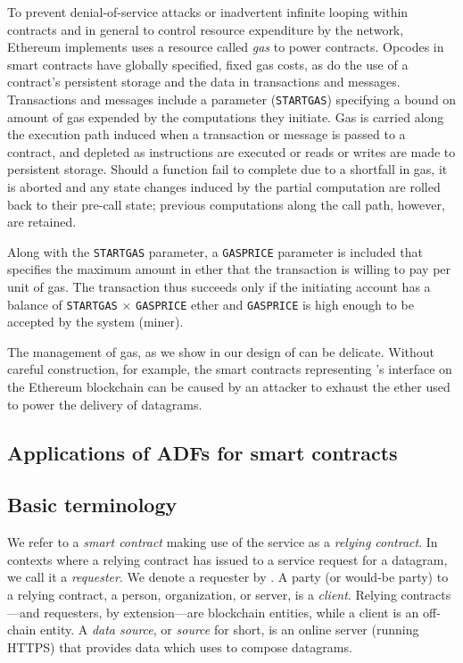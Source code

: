 To prevent denial-of-service attacks or inadvertent infinite looping within contracts and in general to control resource expenditure by the network, Ethereum implements uses a resource called \emph{gas} to power contracts. Opcodes in smart contracts have globally specified, fixed gas costs, as do the use of a contract's persistent storage and the data in transactions and messages. Transactions and messages include a parameter (\texttt{STARTGAS}) specifying a bound on amount of gas expended by the computations they initiate. Gas is carried along the execution path induced when a transaction or message is passed to a contract, and depleted as instructions are executed or reads or writes are made to persistent storage. Should a function fail to complete due to a shortfall in gas, it is aborted and any state changes induced by the partial computation are rolled back to their pre-call state; previous computations along the call path, however, are retained. 

Along with the \texttt{STARTGAS} parameter, a \texttt{GASPRICE} parameter is included that specifies the maximum amount in ether that the transaction is willing to pay per unit of gas. The transaction thus succeeds only if the initiating account has a balance of \texttt{STARTGAS} $\times$ \texttt{GASPRICE} ether and \texttt{GASPRICE} is high enough to be accepted by the system (miner). 

The management of gas, as we show in our design of \tcs can be delicate. Without careful construction, for example, the smart contracts representing \tc's interface on the Ethereum blockchain can be caused by an attacker to exhaust the ether used to power the delivery of datagrams. 

\subsection{Applications of ADFs for smart contracts}
\subsection{Basic terminology}
We refer to a {\em smart contract} making use of the \tcs service as a \emph{relying contract}. In contexts where a relying contract has issued to \tc a service request for a datagram, we call it a \emph{requester}. We denote a requester by \reqcont. A party (or would-be party) to a relying contract, a person, organization, or server, is a \emph{client}. Relying contracts---and requesters, by extension---are blockchain entities, while a client is an off-chain entity. A \emph{data source}, or \emph{source} for short, is an online server (running HTTPS) that provides data which \tc uses to compose datagrams.


